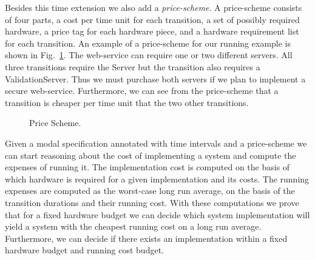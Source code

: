Besides this time extension we also add a \emph{price-scheme}. A price-scheme consists of four parts, a cost per time unit for each transition, a set of possibly required hardware, a price tag for each hardware piece, and a hardware requirement list for each transition. An example of a price-scheme for our running example is shown in Fig.~\ref{fig:price-scheme}. The web-service can require one or two different servers. All three transitions require the Server but the  transition also requires a ValidationServer. Thus we must purchase both servers if we plan to implement a secure web-service. Furthermore, we can see from the price-scheme that a  transition is cheaper per time unit that the two other transitions.

\begin{figure}[ht]
\centering
{}
\caption{Price Scheme.}\label{fig:price-scheme}
\end{figure}    


Given a modal specification annotated with time intervals and a price-scheme we can start reasoning about the cost of implementing a system and compute the expenses of running it. The implementation cost is computed on the basis of which hardware is required for a given implementation and its costs. The running expenses are computed as the worst-case long run average, on the basis of the transition durations and their running cost. 
With these computations we prove that for a fixed hardware budget we can decide which system implementation will yield a system with the cheapest running cost on a long run average. Furthermore, we can decide if there exists an implementation within a fixed hardware budget and running cost budget. 


